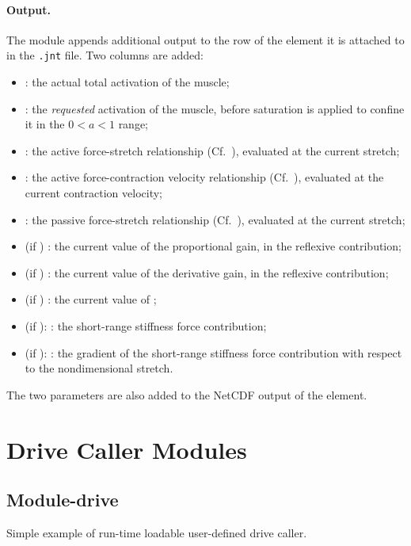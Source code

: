 \paragraph{Output.}
The module appends additional output to the row of the element it is
attached to in the \texttt{.jnt} file. Two columns are added:
\begin{itemize}
  \item {}: the actual total activation of the muscle;
  \item {}: the \emph{requested} activation of the muscle, before
    saturation is applied to confine it in the $0 < a < 1$ range;
  \item {}: the active force-stretch relationship (Cf.~\cite{PENNESTRI-2007-JB}),
    evaluated at the current stretch;
  \item {}: the active force-contraction velocity relationship
    (Cf.~\cite{PENNESTRI-2007-JB}), evaluated at the current contraction velocity;
  \item {}: the passive force-stretch relationship (Cf.~\cite{PENNESTRI-2007-JB}),
    evaluated at the current stretch;
  \item (if ) : the current value of the proportional gain, in the
    reflexive contribution;
  \item (if ) : the current value of the derivative gain, in the
    reflexive contribution;
  \item (if ) : the current value of ;
  \item (if ): : the short-range stiffness force contribution;
  \item (if ): : the gradient of the short-range
    stiffness force contribution with respect to the nondimensional stretch.
\end{itemize}
The two parameters are also added to the NetCDF output of the element.

\section{Drive Caller Modules}

\subsection{Module-drive}
Simple example of run-time loadable user-defined drive caller.


